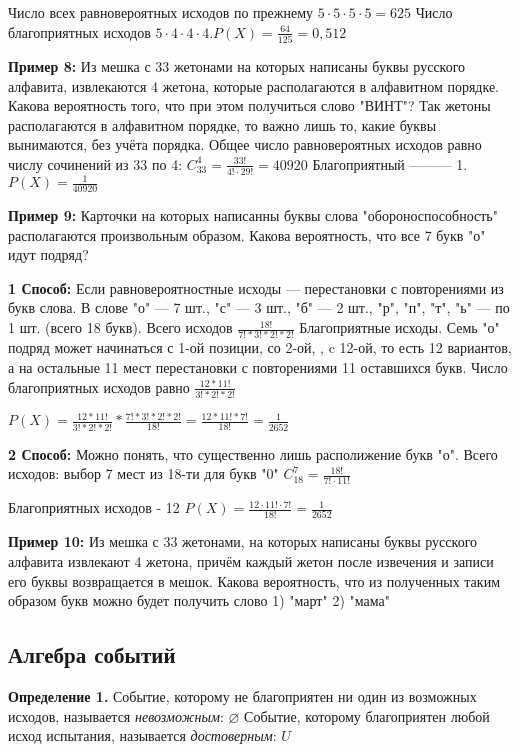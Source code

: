 \documentclass{article}
\begin{document}
    Число всех равновероятных исходов по прежнему  \(5 \cdot 5 \cdot 5 \cdot 5 = 625\)
    Число благоприятных исходов \(5 \cdot 4 \cdot 4 \cdot 4. P(X) = \frac{64}{125} = 0,512\)

    
    \textbf{Пример 8:}
    Из мешка с 33 жетонами на которых написаны буквы русского алфавита, извлекаются 4 жетона, которые располагаются в алфавитном порядке. Какова вероятность того, что при этом получиться слово "ВИНТ"?
    Так жетоны располагаются в алфавитном порядке, то важно лишь то, какие буквы вынимаются, без учёта порядка. Общее число равновероятных исходов равно числу сочинений из 33 по 4:
    \( C_{33}^{4} = \frac{33!}{4! \cdot 29!} = 40920 \)
    Благоприятный ——— 1. \(P(X) = \frac{1}{40920}\)

    
    \textbf{Пример 9:}
    Карточки на которых написанны буквы слова "обороноспособность" располагаются произвольным образом. 
    Какова вероятность, что все 7 букв "о" идут подряд?
    
    \textbf{1 Способ:}
    Если равновероятностные исходы --- перестановки с повторениями из букв слова. 
    В слове "о" --- 7 шт., "с" --- 3 шт., "б" --- 2 шт., "р", "п", "т", "ь" --- по 1 шт. (всего 18 букв).
    Всего исходов \(\frac{18!}{7!*3!*2!*2!}\)
    Благоприятные исходы. Семь "о" подряд может начинаться с 1-ой позиции, со 2-ой, \cdots, c 12-ой, то есть 12 вариантов, а на остальные 11 мест перестановки с повторениями 11 оставшихся букв. 
    Число благоприятных исходов равно \(\frac{12*11!}{3!*2!*2!}\)
    
    \(P(X)=\frac{12*11!}{3!*2!*2!}*\frac{7!*3!*2!*2!}{18!}=\frac{12*11!*7!}{18!}=\frac{1}{2652}\)
    
    \textbf{2 Способ:}
    Можно понять, что существенно лишь располижение букв "о".
    Всего исходов: выбор 7 мест из 18-ти для букв "0"
    \(C_{18}^7=\frac{18!}{7! \cdot 11!}\)

    Благоприятных исходов - 12 \(P(X)=\frac{12 \cdot 11! \cdot 7!}{18!}=\frac{1}{2652}\)
    
    \textbf{Пример 10:}
    Из мешка с 33 жетонами, на которых написаны буквы русского алфавита извлекают 4 жетона, 
    причём каждый жетон после извечения и записи его буквы возвращается в мешок. 
    Какова вероятность, что из полученных таким образом букв можно будет получить слово 1) "март" 2) "мама"


    
    
    \subsection{Алгебра событий}
    \textbf{Определение 1.} Событие, которому не благоприятен ни один из возможных исходов, называется \textit{невозможным}: \(\varnothing\)
    Событие, которому благоприятен любой исход испытания, называется \textit{достоверным}: $U$
\end{document}

